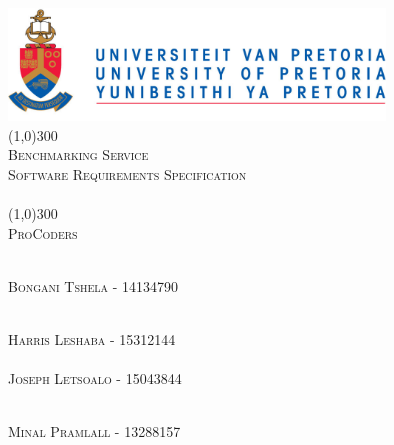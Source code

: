 \documentclass[runningheads,a4paper]{article}
\begin{document}
	
\begin{titlepage}
	\begin{center}
		\includegraphics[width=10cm]{../Images/UP_Logo.PNG}  \\
		[1cm]
		\line(1,0){300} \\
		[0.3cm]
		\textsc{\Large
			Benchmarking Service\\
			Software Requirements Specification\\
			\hfill
		}\\
		[0.1cm]
		\line(1,0){300} \\
		[0.7cm]
		\textsc{\Large
			ProCoders
		} \\
	\end{center}
	
	\begin{center}
		\begin{centre}
			\textsc{\large\\
				Bongani Tshela - 14134790\\ 
			}
		
				\textsc{\large\\
					Harris Leshaba - 15312144\\ 
				}
			\textsc{\large\\
				Joseph Letsoalo - 15043844\\ 
			}
			
			\textsc{\large\\
				Minal Pramlall - 13288157\\ 
			}
			

            

		\end{centre}
		
		
		
	\end{center}
\end{titlepage}

\begingroup

\tableofcontents
{}
\endgroup
\newpage
\end{document}
